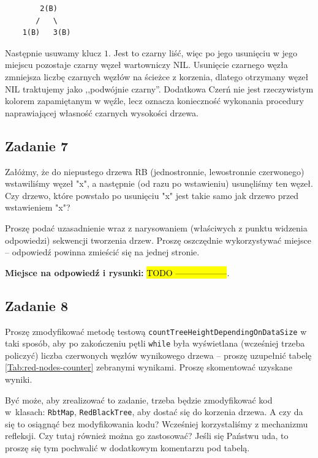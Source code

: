 \documentclass[twoside]{article}
\begin{document}
\begin{verbatim}
        2(B)
       /   \
    1(B)   3(B)
\end{verbatim}

Następnie usuwamy klucz \(1\). Jest to czarny liść, więc po jego usunięciu
w jego miejscu pozostaje czarny węzeł wartowniczy \(\mathrm{NIL}\). Usunięcie
czarnego węzła zmniejsza liczbę czarnych węzłów na ścieżce z korzenia, dlatego
otrzymany węzeł \(\mathrm{NIL}\) traktujemy jako ,,podwójnie czarny''. Dodatkowa
Czerń nie jest rzeczywistym kolorem zapamiętanym w węźle, lecz oznacza
konieczność wykonania procedury naprawiającej własność czarnych wysokości drzewa.

\newpage

\subsection{Zadanie 7}

Załóżmy, że do niepustego drzewa RB (jednostronnie, lewostronnie czerwonego) wstawiliśmy węzeł "x", a następnie (od razu po wstawieniu) usunęliśmy ten węzeł. 
Czy drzewo, które powstało po usunięciu "x" jest takie samo jak drzewo przed wstawieniem "x"? 

Proszę podać uzasadnienie wraz z narysowaniem (właściwych z punktu widzenia odpowiedzi) sekwencji 
tworzenia drzew. Proszę oszczędnie wykorzystywać miejsce -- odpowiedź powinna zmieścić się na 
jednej stronie. 

\noindent \textbf{Miejsce na odpowiedź i rysunki:} \hl{TODO ------------------}.

\newpage

\subsection{Zadanie 8}
Proszę zmodyfikować metodę testową \verb|countTreeHeightDependingOnDataSize| w taki sposób, aby
po zakończeniu pętli \verb|while| była wyświetlana (wcześniej trzeba policzyć) liczba czerwonych węzłów wynikowego drzewa -- proszę uzupełnić tabelę \ref{Tab:red-nodes-counter} zebranymi wynikami.
Proszę skomentować uzyskane wyniki.

Być może, aby zrealizować to zadanie, trzeba będzie zmodyfikować kod w~klasach: \verb|RbtMap|,
\verb|RedBlackTree|, aby dostać się do korzenia drzewa. 
A czy da się to osiągnąć bez modyfikowania kodu?
Wcześniej korzystaliśmy z mechanizmu refleksji.
Czy tutaj również można go zastosować?
Jeśli się Państwu uda, to proszę się tym pochwalić w dodatkowym komentarzu pod tabelą.
\end{document}
